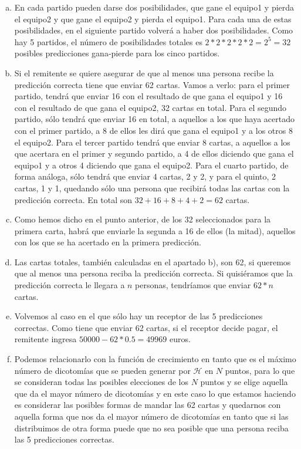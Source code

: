 \documentclass[12pt]{article}
\theoremstyle{definition}
\begin{document}
\begin{pregunta}
\begin{enumerate}[a)]
\item En cada partido pueden darse dos posibilidades, que gane el equipo1 y pierda el equipo2 y que gane el equipo2 y pierda el equipo1. Para cada una de estas posibilidades, en el siguiente partido volverá a haber dos posibilidades. Como hay 5 partidos, el número de posibilidades totales es $2*2*2*2*2=2^5=32$ posibles predicciones gana-pierde para los cinco partidos.
\item Si el remitente se quiere asegurar de que al menos una persona recibe la predicción correcta tiene que enviar 62 cartas. Vamos a verlo: para el primer partido, tendrá que enviar 16 con el resultado de que gana el equipo1 y 16 con el resultado de que gana el equipo2, 32 cartas en total. Para el segundo partido, sólo tendrá que enviar 16 en total, a aquellos a los que haya acertado con el primer partido, a 8 de ellos les dirá que gana el equipo1 y a los otros 8 el equipo2. Para el tercer partido tendrá que enviar 8 cartas, a aquellos a los que acertara en el primer y segundo partido, a 4 de ellos diciendo que gana el equipo1 y a otros 4 diciendo que gana el equipo2. Para el cuarto partido, de forma análoga, sólo tendrá que enviar 4 cartas, 2 y 2, y para el quinto,  2 cartas, 1 y 1, quedando sólo una persona que recibirá todas las cartas con la predicción correcta. En total son $32+16+8+4+2=62$ cartas.
\item Como hemos dicho en el punto anterior, de los 32 seleccionados para la primera carta, habrá que enviarle la segunda a 16 de ellos (la mitad), aquellos con los que se ha acertado en la primera predicción.
\item Las cartas totales, también calculadas en el apartado b), son 62, si queremos que al menos una persona reciba la predicción correcta. Si quisiéramos que la predicción correcta le llegara a $n$ personas, tendríamos que enviar $62*n$ cartas.
\item Volvemos al caso en el que sólo hay un receptor de las 5 predicciones correctas. Como tiene que enviar 62 cartas, si el receptor decide pagar, el remitente ingresa $50000-62*0.5=49969$ euros.
\item Podemos relacionarlo con la función de crecimiento en tanto que es el máximo número de dicotomías que se pueden generar por $\mathcal{H}$ en $N$ puntos, para lo que se consideran todas las posibles elecciones de los $N$ puntos y se elige aquella que da el mayor número de dicotomías y en este caso lo que estamos haciendo es considerar las posibles formas de mandar las 62 cartas y quedarnos con aquella forma que nos da el mayor número de dicotomías en tanto que si las distribuimos de otra forma puede que no sea posible que una persona reciba las 5 predicciones correctas.
\end{enumerate}

\end{pregunta}
\end{document}
